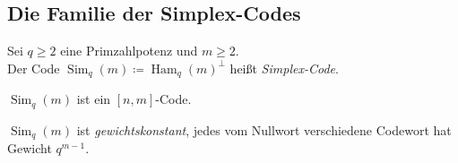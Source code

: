 \documentclass{cheat-sheet}
\DeclareMathOperator{\Ham}{Ham} %
\DeclareMathOperator{\Sim}{Sim} %
\begin{document}
\subsection{Die Familie der Simplex-Codes}

\begin{defn}
  Sei $q \geq 2$ eine Primzahlpotenz und $m \geq 2$. \\
  Der Code $\Sim_q(m) \coloneqq \Ham_q(m)^\perp$ heißt \emph{Simplex-Code}.
\end{defn}

\begin{bem}
  $\Sim_q(m)$ ist ein $[n, m]$-Code.
\end{bem}

\begin{satz}
  $\Sim_q(m)$ ist \emph{gewichtskonstant}, \dh{} jedes vom Nullwort verschiedene Codewort hat Gewicht $q^{m-1}$.
\end{satz}
\end{document}
